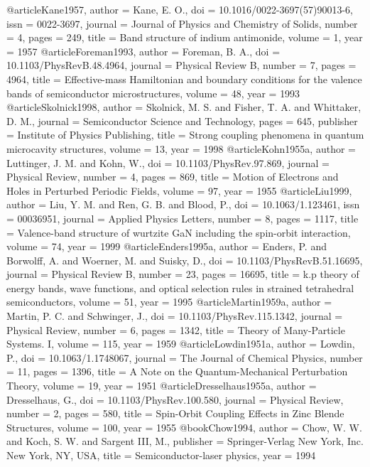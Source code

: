 @article{Kane1957,
author = {Kane, E. O.},
doi = {10.1016/0022-3697(57)90013-6},
issn = {0022-3697},
journal = {Journal of Physics and Chemistry of Solids},
number = {4},
pages = {249},
title = {{Band structure of indium antimonide}},
volume = {1},
year = {1957}
}
@article{Foreman1993,
author = {Foreman, B. A.},
doi = {10.1103/PhysRevB.48.4964},
journal = {Physical Review B},
number = {7},
pages = {4964},
title = {{Effective-mass Hamiltonian and boundary conditions for the valence bands of semiconductor microstructures}},
volume = {48},
year = {1993}
}
@article{Skolnick1998,
author = {Skolnick, M. S. and Fisher, T. A. and Whittaker, D. M.},
journal = {Semiconductor Science and Technology},
pages = {645},
publisher = {Institute of Physics Publishing},
title = {{Strong coupling phenomena in quantum microcavity structures}},
volume = {13},
year = {1998}
}
@article{Kohn1955a,
author = {Luttinger, J. M. and Kohn, W.},
doi = {10.1103/PhysRev.97.869},
journal = {Physical Review},
number = {4},
pages = {869},
title = {{Motion of Electrons and Holes in Perturbed Periodic Fields}},
volume = {97},
year = {1955}
}
@article{Liu1999,
author = {Liu, Y. M. and Ren, G. B. and Blood, P.},
doi = {10.1063/1.123461},
issn = {00036951},
journal = {Applied Physics Letters},
number = {8},
pages = {1117},
title = {{Valence-band structure of wurtzite GaN including the spin-orbit interaction}},
volume = {74},
year = {1999}
}
@article{Enders1995a,
author = {Enders, P. and Borwolff, A. and Woerner, M. and Suisky, D.},
doi = {10.1103/PhysRevB.51.16695},
journal = {Physical Review B},
number = {23},
pages = {16695},
title = {k.p theory of energy bands, wave functions, and optical selection rules in strained tetrahedral semiconductors},
volume = {51},
year = {1995}
}
@article{Martin1959a,
author = {Martin, P. C. and Schwinger, J.},
doi = {10.1103/PhysRev.115.1342},
journal = {Physical Review},
number = {6},
pages = {1342},
title = {{Theory of Many-Particle Systems. I}},
volume = {115},
year = {1959}
}
@article{Lowdin1951a,
author = {Lowdin, P.},
doi = {10.1063/1.1748067},
journal = {The Journal of Chemical Physics},
number = {11},
pages = {1396},
title = {{A Note on the Quantum-Mechanical Perturbation Theory}},
volume = {19},
year = {1951}
}
@article{Dresselhaus1955a,
author = {Dresselhaus, G.},
doi = {10.1103/PhysRev.100.580},
journal = {Physical Review},
number = {2},
pages = {580},
title = {{Spin-Orbit Coupling Effects in Zinc Blende Structures}},
volume = {100},
year = {1955}
}
@book{Chow1994,
author = {Chow, W. W. and Koch, S. W. and {Sargent III}, M.},
publisher = {Springer-Verlag New York, Inc. New York, NY, USA},
title = {{Semiconductor-laser physics}},
year = {1994}
}
